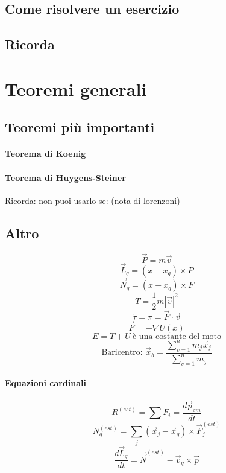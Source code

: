 \documentclass[a4paper,12pt]{article}
\begin{document}
\subsection{Come risolvere un esercizio}

\subsection{Ricorda}

\section{Teoremi generali}
\subsection{Teoremi più importanti}
\paragraph{Teorema di Koenig}

\paragraph{Teorema di Huygens-Steiner}
Ricorda: non puoi usarlo se: (nota di lorenzoni)

\subsection{Altro}
$$\vec{P}=m\vec{v} $$
$$ \vec{L}_q = (x-x_q)\times P$$
$$\vec{N}_q = (x-x_q)\times F $$
$$ T = \frac{1}{2} m|\vec{v}|^2 $$
$$ \dot{\tau} = \pi = \vec{F}\cdot\vec{v}$$
$$ \vec{F} = -\nabla U(x)$$
$$E = T+U\ \text{è una costante del moto} $$
$$\text{Baricentro: } \vec{x}_b = \dfrac{\sum_{v=1}^n m_j \vec{x}_j}{\sum_{v=1}^n m_j} $$
\paragraph{Equazioni cardinali}
$$ R^{(est)} = \sum F_i = \frac{d\vec{p}_{cm}}{dt}$$
$$ N_q^{(est)} = \sum_j (\vec{x}_j-\vec{x}_q)\times \vec{F}_j^{(est)} $$
$$ \frac{d\vec{L}_q}{dt}=\vec{N}^{(est)}-\vec{v}_q\times\vec{p}$$
\end{document}
